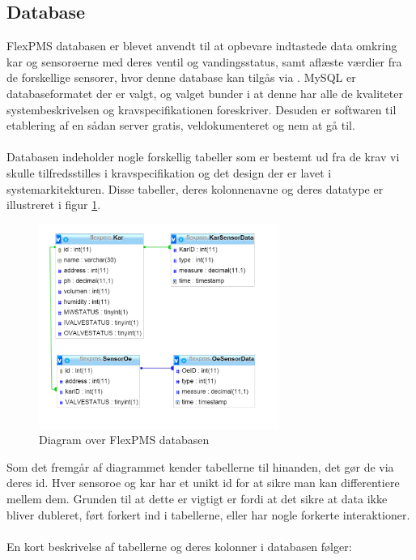 \subsection{Database}
FlexPMS databasen er blevet anvendt til at opbevare indtastede data omkring kar og sensorøerne med deres ventil og vandingsstatus, samt aflæste værdier fra de forskellige sensorer, hvor denne database kan tilgås via . MySQL er databaseformatet der er valgt, og valget bunder i at denne har alle de kvaliteter systembeskrivelsen og kravspecifikationen foreskriver. Desuden er softwaren til etablering af en sådan server gratis, veldokumenteret og nem at gå til.
\\\\
Databasen indeholder nogle forskellig tabeller som er bestemt ud fra de krav vi skulle tilfredsstilles i kravspecifikation og det design der er lavet i systemarkitekturen. Disse tabeller, deres kolonnenavne og deres datatype er illustreret i figur \ref{fig:DB}. 

\begin{figure}[H]
    \centering
    \includegraphics[width=0.7\textwidth]{SoftwareArkitektur/GUI/photo/DB_diagram.PNG}
    \caption{Diagram over FlexPMS databasen}
    \label{fig:DB}
\end{figure}

Som det fremgår af diagrammet kender tabellerne til hinanden, det gør de via deres id. Hver \gls{sensoroe} og \gls{kar} har et unikt id for at sikre man kan differentiere mellem dem. Grunden til at dette er vigtigt er fordi at det sikre at data ikke bliver dubleret, ført forkert ind i tabellerne, eller har nogle forkerte interaktioner.
\\\\
En kort beskrivelse af tabellerne og deres kolonner i databasen følger:


